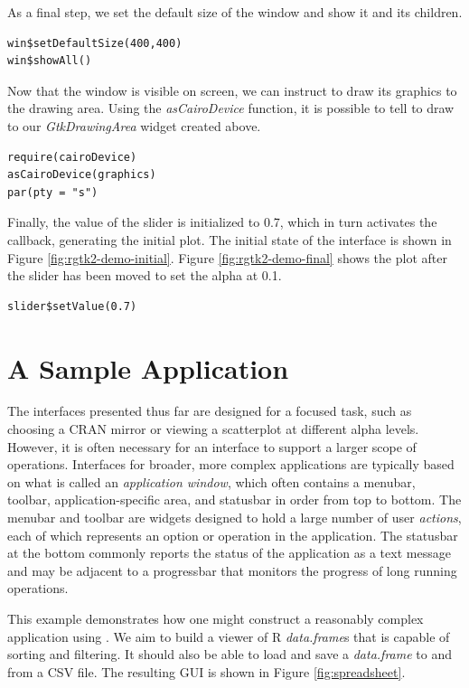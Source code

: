\documentclass[article]{jss}
\begin{document}
As a final step, we set the default size of the window and show it and its children.
\begin{verbatim}
win$setDefaultSize(400,400)
win$showAll() 
\end{verbatim}

Now that the window is visible on screen, we can instruct  to draw
its graphics to the drawing area. Using the \emph{asCairoDevice} function, it is possible
to tell  to draw to our \emph{GtkDrawingArea} widget created above.
\begin{verbatim}
require(cairoDevice)
asCairoDevice(graphics)
par(pty = "s")
\end{verbatim}

Finally, the value of the slider is initialized to 0.7, which in turn
activates the callback, generating the initial plot. The initial state
of the interface is shown in Figure \ref{fig:rgtk2-demo-initial}.
Figure \ref{fig:rgtk2-demo-final} shows the plot after the slider has been
moved to set the alpha at 0.1.
\begin{verbatim}
slider$setValue(0.7)
\end{verbatim}

\section{A Sample Application}\label{sec:spreadsheet-example}

The interfaces presented thus far are designed for a focused task, such as 
choosing a CRAN mirror or viewing a scatterplot at different alpha levels.
However, it is often necessary for an interface to support a larger scope of
operations. Interfaces for broader, more complex applications are typically based on 
what is called an \emph{application window}, which often contains a menubar, 
toolbar, application-specific area, and statusbar in order from top to bottom. The
menubar and toolbar are widgets designed to hold a large number of user 
\emph{actions}, each of which represents an option or operation in the application.
The statusbar at the bottom commonly reports the status of the application
as a text message and may be adjacent to a progressbar that monitors
the progress of long running operations.

This example demonstrates how one might construct a reasonably complex
application using . We aim to build a viewer of R \emph{data.frame}s that
is capable of sorting and filtering. It should also be able to load and save
a \emph{data.frame} to and from a CSV file. The resulting GUI is shown in Figure
\ref{fig:spreadsheet}.
\end{document}
